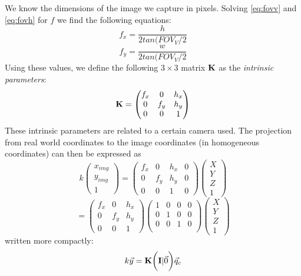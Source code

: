 We know the dimensions of the image we capture in pixels. Solving \autoref{eq:fovv} and \autoref{eq:fovh} for $f$ we find the following equations:
\begin{equation}
    f_x = \frac{h}{2tan(FOV_V/2}
\end{equation}
\begin{equation}
    f_y = \frac{w}{2tan(FOV_V/2}
\end{equation}
Using these values, we define the following $3\times3$ matrix $\mathbf{K}$ as the \textit{intrinsic parameters}:
\begin{equation}
    \mathbf{K} = \begin{pmatrix}
        f_x & 0 & h_x \\
        0 & f_y & h_y \\
        0 & 0 & 1
    \end{pmatrix}
\end{equation}
These intrinsic parameters are related to a certain camera used. The projection from real world coordinates to the image coordinates (in homogeneous coordinates) can then be expressed as
\begin{equation}
    k\begin{pmatrix}
        x_{img}\\y_{img}\\1
    \end{pmatrix} = \begin{pmatrix}
        f_x & 0 & h_x & 0\\
        0 & f_y & h_y & 0\\
        0 & 0 & 1 & 0
    \end{pmatrix}\begin{pmatrix}
        X \\ Y \\ Z \\ 1
    \end{pmatrix}
\end{equation}
\begin{equation*}
    = \begin{pmatrix}
        f_x & 0 & h_x \\
        0 & f_y & h_y \\
        0 & 0 & 1
    \end{pmatrix}
    \begin{pmatrix}
        1 & 0 & 0 & 0\\
        0 & 1 & 0 & 0\\
        0 & 0 & 1 & 0\\
    \end{pmatrix}
    \begin{pmatrix}
        X \\ Y \\ Z \\ 1
    \end{pmatrix}
\end{equation*}
written more compactly:
\begin{equation}
    k\vec y = \mathbf{K} \biggl(\mathbf{I} \lvert \vec 0\biggr)\vec q_c
\end{equation}

